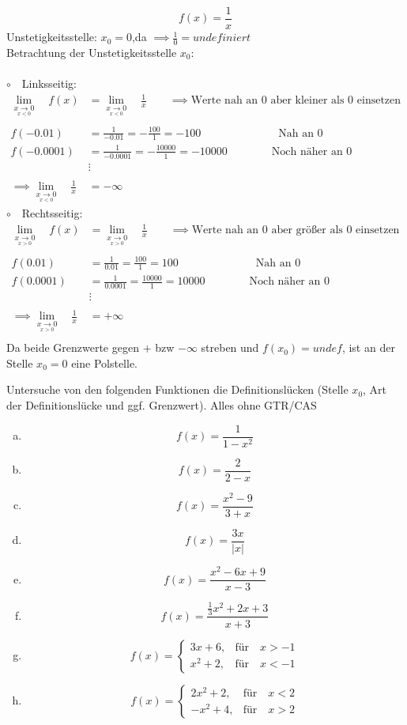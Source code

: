 \documentclass[a4paper,12pt]{article}
\newcommand{\limesr}[2]{
	\lim\limits_{\underset{x > #1}{x\rightarrow #1}}\quad  #2
}
\newcommand{\limesl}[2]{
	\lim\limits_{\underset{x < #1}{x\rightarrow #1}}\quad  #2
}
\newcommand{\Aufgabe}[2]{
	{
		\vspace*{0.3cm}
		\begin{tcolorbox}[breakable,colback=yellow!0,colframe=black!65!black,title=\textbf{Aufgabe #1:},width=\linewidth ]
			{#2}
		\end{tcolorbox}
		
		
	}
}
\newcommand{\Beispiel}[1]{
	\vspace*{0.3cm}
	\begin{tcolorbox}[breakable,colback=yellow!0,colframe=green!65!black,title=\textbf{Beispiel:},width=\linewidth ]
		{#1}
	\end{tcolorbox}
}
\newcommand{\abc}[1]{
	\begin{enumerate}[(a)]
		#1
	\end{enumerate}
}
\begin{document}
\newpage
	\Aufgabe{3 (Stetigkeit/Unstetigkeit)}{
		\Beispiel{
			\[f(x)=\frac{1}{x}\]
			Unstetigkeitsstelle: \quad $x_0 = 0$,\quad da \quad $\implies \frac{1}{0}= undefiniert$ \\
			Betrachtung der Unstetigkeitsstelle $x_0$:\\\\
			$\circ\quad $Linksseitig:
			\begin{align*}
				\limesl{0}{f(x)}&=\limesl{0}{\frac{1}{x}}\qquad\implies \text{Werte nah an 0 aber kleiner als 0 einsetzen} \\\\
				f(-0.01)&=\frac{1}{-0.01}=-\frac{100}{1}= -100\qquad\qquad\quad\qquad\text{Nah an 0}\\
				f(-0.0001)&=\frac{1}{-0.0001}=-\frac{10000}{1}= -10000\qquad\qquad\text{Noch näher an 0}\\
				&\vdots\\\\
				\implies \limesl{0}{\frac{1}{x}} &= -\infty
			\end{align*}
			$\circ\quad $Rechtsseitig:
			\begin{align*}
				\limesr{0}{f(x)}&=\limesr{0}{\frac{1}{x}}\qquad\implies \text{Werte nah an 0 aber größer als 0 einsetzen} \\\\
				f(0.01)&=\frac{1}{0.01}=\frac{100}{1}= 100\qquad\qquad\quad\qquad\text{Nah an 0}\\
				f(0.0001)&=\frac{1}{0.0001}=\frac{10000}{1}= 10000\qquad\qquad\text{Noch näher an 0}\\
				&\vdots\\\\
				\implies \limesr{0}{\frac{1}{x}} &= +\infty\\
			\end{align*}
		Da beide Grenzwerte gegen $+$ bzw $- \infty$  streben und $f(x_0)=undef$, ist an der Stelle $x_0=0$ eine Polstelle.
		}\newpage
	Untersuche von den folgenden Funktionen die Definitionslücken (Stelle $x_0$, Art der
	Definitionslücke und ggf. Grenzwert). Alles ohne GTR/CAS
		\abc{
			\item \[f(x)=\frac{1}{1-x^2}\]
			\item \[f(x)=\frac{2}{2-x}\]
			\item \[f(x)=\frac{x^2-9}{3+x}\]
			\item \[f(x)=\frac{3x}{|x|}\]
			\item \[f(x)=\frac{x^2-6x+ 9
			}{x-3}\]
			\item \[f(x)=\frac{\frac{1}{3}x^2+ 2x + 3
			}{x+3}\]
			\item \[f(x)=\begin{cases}
				3x+6, & \text{für}\quad x>-1 \\
				x^2+2, & \text{für}\quad x<-1
			\end{cases}\]
			\item \[f(x)=\begin{cases}
				2x^2+2, & \text{für}\quad x<2 \\
				-x^2+4, & \text{für}\quad x>2
			\end{cases}\]

		}
	}
\end{document}
